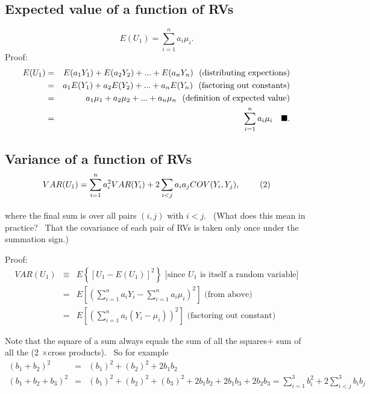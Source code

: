 \documentclass[11pt]{article}
\begin{document}
\subsection{Expected value of a function of RVs\protect\bigskip}

\begin{equation}
E(U_{1})=\sum_{i=1}^{n}a_{i}\mu _{i}.  \tag{1}
\end{equation}%
Proof:%
\begin{eqnarray*}
E(U_{1}) &=&E(a_{1}Y_{1})+E(a_{2}Y_{2})+...+E(a_{n}Y_{n})\text{ \
(distributing expections)} \\
&=&a_{1}E(Y_{1})+a_{2}E(Y_{2})+...+a_{n}E(Y_{n})\text{ \ (factoring out
constants)} \\
&=&a_{1}\mu _{1}+a_{2}\mu _{2}+...+a_{n}\mu _{n}\text{ \ (definition of
expected value)} \\
&=&\sum_{i=1}^{n}a_{i}\mu _{i}\text{ \ \ }\blacksquare .
\end{eqnarray*}%
\newpage

\subsection{Variance of a function of RVs\protect\bigskip 
\protect\begin{equation}
VAR(U_{1})=\sum_{i=1}^{n}a_{i}^{2}VAR(Y_{i})+2%
\sum_{i<j}a_{i}a_{j}COV(Y_{i},Y_{j}),\text{ }   \tag{2}
\protect\end{equation}%
}

where the final sum is over all pairs $(i,j)$ with $i<j$. \ (What does this
mean in practice? \ That the covariance of each pair of RVs is taken only
once under the summation sign.)\medskip

Proof:%
\begin{eqnarray*}
VAR(U_{1}) &\equiv &E\left\{ [U_{1}-E(U_{1})]^{2}\right\} \text{ \ [since }%
U_{1}\text{ is itself a random variable]} \\
&=&E\left[ \left( \sum_{i=1}^{n}a_{i}Y_{i}-\sum_{i=1}^{n}a_{i}\mu
_{i}\right) ^{2}\right] \text{ \ (from above)} \\
&=&E\left[ \left( \sum_{i=1}^{n}a_{i}\left( Y_{i}-\mu _{i}\right) \right)
^{2}\right] \text{ \ (factoring out constant)}
\end{eqnarray*}

Note that the square of a sum always equals the sum of all the squares$+$
sum of all the (2 $\times $cross products). \ So for example%
\begin{eqnarray*}
\left( b_{1}+b_{2}\right) ^{2} &=&\left( b_{1}\right) ^{2}+\left(
b_{2}\right) ^{2}+2b_{1}b_{2} \\
\left( b_{1}+b_{2}+b_{3}\right) ^{2} &=&\left( b_{1}\right) ^{2}+\left(
b_{2}\right) ^{2}+\left( b_{3}\right)
^{2}+2b_{1}b_{2}+2b_{1}b_{3}+2b_{2}b_{3}=\sum_{i=1}^{3}b_{i}^{2}+2%
\sum_{i<j}^{3}b_{i}b_{j}
\end{eqnarray*}
\end{document}
